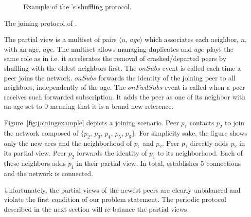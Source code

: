 \begin{figure*}
  \centering
  \hspace{10pt}
  \hspace{10pt}
  \caption{\label{fig:cyclicexample}Example of the \SPRAY's shuffling
    protocol. }
\end{figure*}

\begin{algorithm}

\caption{\label{algo:joining}The joining protocol of \SPRAY.}
\end{algorithm}

The partial view is a multiset of pairs $\langle n,\, age\rangle$ which
associates each neighbor, $n$, with an age, $age$. The multiset allows managing
duplicates and $age$ plays the same role as in \CYCLON i.e.  it accelerates
the removal of crashed/departed peers by shuffling with the oldest neighbors
first. The $onSubs$ event is called each time a peer joins the
network. $onSubs$ forwards the identity of the joining peer to all neighbors,
independently of the age. The $onFwdSubs$ event is called when a peer receives
such forwarded subscription. It adds the peer as one of its neighbor with an
age set to $0$ meaning that it is a brand new reference.

Figure~\ref{fig:joiningexample} depicts a joining scenario.
Peer $p_1$ contacts $p_2$ to join the network composed of $\{p_2$, $p_3$,
$p_4$, $p_5$, $p_6\}$. For simplicity sake, the figure shows only the new arcs
and the neighborhood of $p_1$ and $p_2$. Peer $p_1$ directly adds $p_2$ in its
partial view. Peer $p_2$ forwards the identity of $p_1$ to its
neighborhood. Each of these neighbors adds $p_1$ in their partial view. In
total, \SPRAY establishes 5 connections and the network is connected.

Unfortunately, the partial views of the newest peers are clearly unbalanced and
violate the first condition of our problem statement. The periodic protocol
described in the next section will re-balance the partial views.

